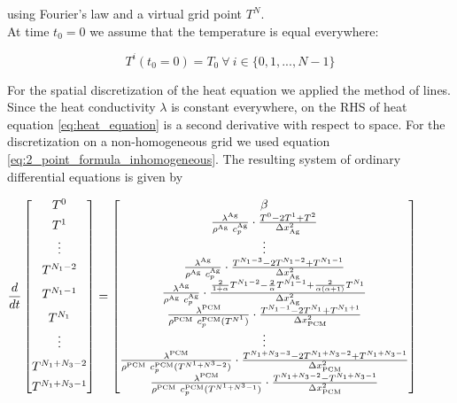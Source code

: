 \documentclass{scrartcl}[12pt, halfparskip]
\begin{document}
using Fourier's law and a virtual grid point $T^N$. \\
At time $t_0=0$ we assume that the temperature is equal everywhere:

\begin{equation}
	T^i(t_0=0) = T_0 \ \forall \ i \in \{ 0,1,...,N-1 \}
\end{equation}

For the spatial discretization of the heat equation we applied the method of lines. Since the heat conductivity $\lambda$ is constant everywhere, on the RHS of heat equation \eqref{eq:heat_equation} is a second derivative with respect to space. For the discretization on a non-homogeneous grid we used equation \eqref{eq:2_point_formula_inhomogeneous}. The resulting system of ordinary differential equations is given by

\begin{align}
\hspace{-1cm}
\frac{d}{dt} \begin{bmatrix*}
T^0 \\[1ex]
T^1 \\[0.3ex]
\vdots \\[1ex]
T^{N_1-2} \\[1.7ex]
T^{N_1-1} \\[1.7ex]
T^{N_1} \\[0.5ex]
\vdots \\[1.5ex]
T^{N_1+N_3-2} \\[1ex]
T^{N_1+N_3-1}
\end{bmatrix*} =
\begin{bmatrix}
\beta \\
\frac{\lambda^{\text{Ag}}}{\rho^{\text{Ag}} \ c_p^{\text{Ag}}} \cdot \frac{T^{0} - 2 T^{1} + T^{2}}{\Delta x_{\text{Ag}}^2} \\
\vdots \\
\frac{\lambda^{\text{Ag}}}{\rho^{\text{Ag}} \ c_p^{\text{Ag}}} \cdot \frac{T^{N_1-3} - 2 T^{N_1-2} + T^{N_1-1}}{\Delta x_{\text{Ag}}^2} \\
\frac{\lambda^{\text{Ag}}}{\rho^{\text{Ag}} \ c_p^{\text{Ag}}} \cdot \frac{\frac{2}{1+\alpha} T^{N_1-2} - \frac{2}{\alpha} T^{N_1-1} + \frac{2}{\alpha (\alpha + 1)} T^{N_1}}{\Delta x_{\text{Ag}}^2} \\
\frac{\lambda^{\text{PCM}}}{\rho^{\text{PCM}} \ c_p^{\text{PCM}}(T^{N^1})} \cdot \frac{T^{N_1-1} - 2 T^{N_1} + T^{N_1+1}}{\Delta x_{\text{PCM}}^2} \\
\vdots \\
\frac{\lambda^{\text{PCM}}}{\rho^{\text{PCM}} \ c_p^{\text{PCM}}(T^{N^1+N^3-2})} \cdot \frac{T^{N_1+N_3-3} - 2 T^{N_1+N_3-2} + T^{N_1+N_3-1}}{\Delta x_{\text{PCM}}^2} \\
\frac{\lambda^{\text{PCM}}}{\rho^{\text{PCM}} \ c_p^{\text{PCM}}(T^{N^1+N^3-1})} \cdot \frac{T^{N_1+N_3-2} - T^{N_1+N_3-1}}{\Delta x_{\text{PCM}}^2}
\end{bmatrix}
\label{eq:heat_equation_discretized}
\end{align}
\end{document}
